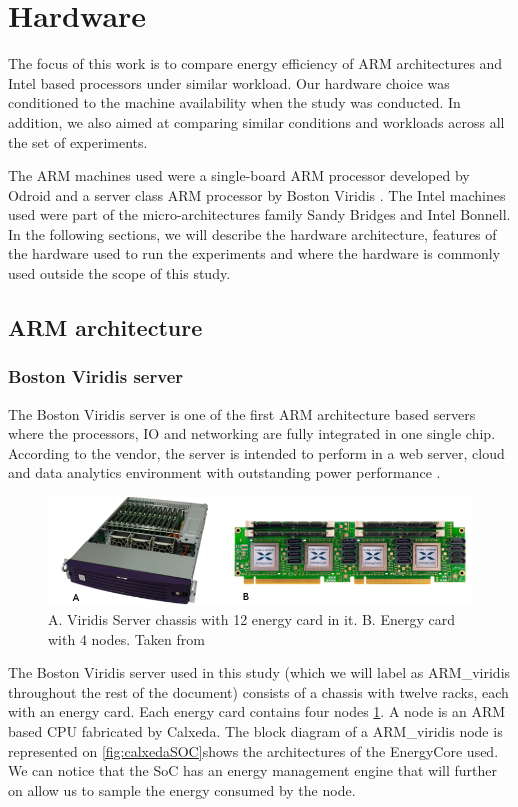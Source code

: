 \section{Hardware}
The focus of this work is to compare energy efficiency of ARM architectures and Intel based 
processors under similar workload. Our hardware choice  was conditioned to the
machine availability when the study was conducted. In addition, we also aimed
at comparing similar conditions and workloads across all the set of experiments. 

The ARM machines used were a single-board ARM processor developed by Odroid
\cite{ODROID_XU3} and a server class ARM processor by Boston 
Viridis \cite{VIRIDIS}. The Intel machines used were part of the micro-architectures family Sandy Bridges and Intel Bonnell. In the following sections, we will describe the hardware architecture, features of the hardware used to run the experiments and where the hardware is commonly used outside the scope of this study. 

\subsection{ARM architecture}
\subsubsection*{Boston Viridis server}

The Boston Viridis server is one of the first ARM architecture based servers
where the processors, IO and networking are fully integrated in one single chip.
According to the vendor, the server is intended to perform in a web server,
cloud and data analytics environment with outstanding power performance \cite{VIRIDIS}.

\begin{figure}[h!]
  \centering
    \includegraphics[width=\textwidth]{"img/viridis&SoC"}
    \caption{A. Viridis Server chassis with 12 energy card in it. B. Energy card
with 4 nodes. Taken from \cite{VIRIDIS}}
    \label{fig:viridis&SoC}
\end{figure}


The Boston Viridis server used in this study (which we will label as ARM\_viridis throughout the rest of the document) consists of a chassis with twelve racks, each with an
energy card. Each energy card contains four nodes \ref{fig:viridis&SoC}. 
A node is an ARM based CPU fabricated by Calxeda. The block diagram of a ARM\_viridis node is represented on \ref{fig:calxedaSOC}shows the architectures of the EnergyCore used. We can notice that the SoC has an energy management engine that will further on allow us to sample the energy consumed by the node.  

